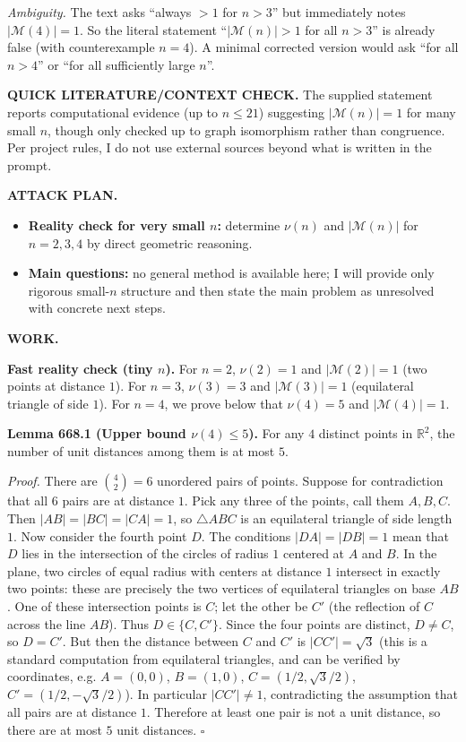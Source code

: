 \medskip
\noindent\emph{Ambiguity.}
The text asks ``always $>1$ for $n>3$'' but immediately notes $|\mathcal{M}(4)|=1$.
So the literal statement ``$|\mathcal{M}(n)|>1$ for all $n>3$'' is already false (with counterexample $n=4$).
A minimal corrected version would ask ``for all $n>4$'' or ``for all sufficiently large $n$''.

\bigskip
\noindent\textbf{QUICK LITERATURE/CONTEXT CHECK.}
The supplied statement reports computational evidence (up to $n\le 21$) suggesting $|\mathcal{M}(n)|=1$ for many small $n$, though only checked up to graph isomorphism rather than congruence.
Per project rules, I do not use external sources beyond what is written in the prompt.

\bigskip
\noindent\textbf{ATTACK PLAN.}
\begin{itemize}
\item \textbf{Reality check for very small $n$:} determine $\nu(n)$ and $|\mathcal{M}(n)|$ for $n=2,3,4$ by direct geometric reasoning.
\item \textbf{Main questions:} no general method is available here; I will provide only rigorous small-$n$ structure and then state the main problem as unresolved with concrete next steps.
\end{itemize}

\bigskip
\noindent\textbf{WORK.}

\medskip
\noindent\textbf{Fast reality check (tiny $n$).}
For $n=2$, $\nu(2)=1$ and $|\mathcal{M}(2)|=1$ (two points at distance $1$).
For $n=3$, $\nu(3)=3$ and $|\mathcal{M}(3)|=1$ (equilateral triangle of side $1$).
For $n=4$, we prove below that $\nu(4)=5$ and $|\mathcal{M}(4)|=1$.

\medskip
\noindent\textbf{Lemma 668.1 (Upper bound $\nu(4)\le 5$).}
For any $4$ distinct points in $\mathbb{R}^2$, the number of unit distances among them is at most $5$.

\noindent\emph{Proof.}
There are $\binom{4}{2}=6$ unordered pairs of points.
Suppose for contradiction that all $6$ pairs are at distance $1$.
Pick any three of the points, call them $A,B,C$.
Then $|AB|=|BC|=|CA|=1$, so $\triangle ABC$ is an equilateral triangle of side length $1$.
Now consider the fourth point $D$.
The conditions $|DA|=|DB|=1$ mean that $D$ lies in the intersection of the circles of radius $1$ centered at $A$ and $B$.
In the plane, two circles of equal radius with centers at distance $1$ intersect in exactly two points: these are precisely the two vertices of equilateral triangles on base $AB$.
One of these intersection points is $C$; let the other be $C'$ (the reflection of $C$ across the line $AB$).
Thus $D\in\{C,C'\}$.
Since the four points are distinct, $D\ne C$, so $D=C'$.
But then the distance between $C$ and $C'$ is $|CC'|=\sqrt{3}$ (this is a standard computation from equilateral triangles, and can be verified by coordinates, e.g. $A=(0,0)$, $B=(1,0)$, $C=(1/2,\sqrt3/2)$, $C'=(1/2,-\sqrt3/2)$).
In particular $|CC'|\ne 1$, contradicting the assumption that all pairs are at distance $1$.
Therefore at least one pair is not a unit distance, so there are at most $5$ unit distances.
\hfill$\square$

